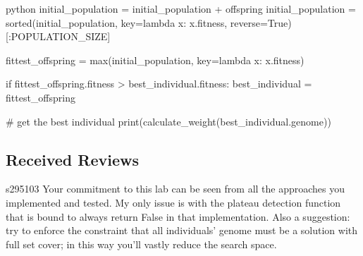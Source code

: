 \begin{mintedbox}{python}
        initial_population = initial_population + offspring
        initial_population = sorted(initial_population, key=lambda x: x.fitness, reverse=True)[:POPULATION_SIZE]

        fittest_offspring = max(initial_population, key=lambda x: x.fitness)

        if fittest_offspring.fitness > best_individual.fitness:
            best_individual = fittest_offspring

    # get the best individual
    print(calculate_weight(best_individual.genome))
\end{mintedbox}

\subsection{Received Reviews}

\begin{tcolorbox}[colback=green!5!white,colframe=green!75!black,code={\singlespacing}]
    s295103
    \tcblower
    Your commitment to this lab can be seen from all the approaches you implemented and tested.
    My only issue is with the plateau detection function that is bound to always return False in that implementation.
    Also a suggestion: try to enforce the constraint that all individuals' genome must be a solution with full set cover; in this way you'll vastly reduce the search space.
\end{tcolorbox}

